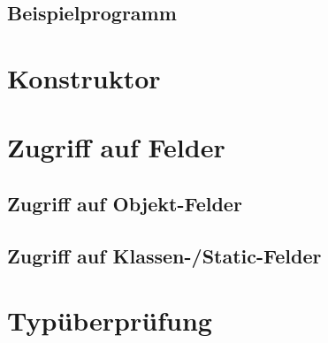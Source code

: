 \documentclass[conference]{IEEEtran}
\begin{document}
\subsection{Beispielprogramm}

\section{Konstruktor}

\section{Zugriff auf Felder}
\subsection{Zugriff auf Objekt-Felder}
\subsection{Zugriff auf Klassen-/Static-Felder}

\section{Typüberprüfung}


 
\end{document}
